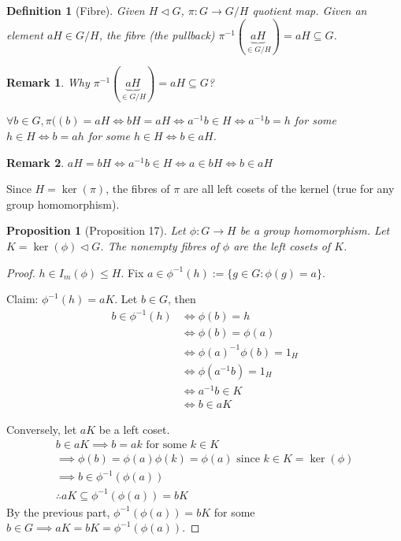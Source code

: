 \documentclass[11pt, oneside]{book}
\theoremstyle{break}
\newtheorem*{proof}{Proof}
\newtheorem{propo}{Proposition}[section]
\newtheorem*{remark}{Remark}
\newtheorem{defn}{Definition}[section]
\begin{document}
\begin{defn}[Fibre]
    Given $H \triangleleft G$, $\pi : G \to G/H$ quotient map. Given an element $aH \in G / H$, the fibre (the pullback) $\pi^{-1} (\underbrace{aH}_{\in G/H}) = aH \subseteq G$.
\end{defn}

\begin{remark}
    Why $\pi^{-1} (\underbrace{aH}_{\in G/H}) = aH \subseteq G$?

    $\forall b \in G, \pi((b) = aH \iff bH = aH \iff a^{-1}b \in H \iff a^{-1}b = h$ for some $h \in H \iff b = ah$ for some $h \in H \iff b \in aH$.
\end{remark}

\begin{remark}
    $aH = bH \iff a^{-1}b \in H \iff a \in bH \iff b \in aH$
\end{remark}

Since $H = \ker(\pi)$, the fibres of $\pi$ are all left cosets of the kernel (true for any group homomorphism).

\begin{propo}[Proposition 17]\label{propo:17}
    Let $\phi : G \to H$ be a group homomorphism. Let $K = \ker(\phi) \triangleleft G$. The nonempty fibres of $\phi$ are the left cosets of $K$.
\end{propo}

\begin{proof}
    $h \in I_m(\phi) \leq H$. Fix $a \in \phi^{-1}(h) := \{g \in G : \phi(g) = a\}$.

    Claim: $\phi^{-1} (h) = aK$. Let $b \in G$, then
    \begin{align*}
        b \in \phi^{-1} (h) &\iff \phi(b) = h \\
                &\iff \phi(b) = \phi(a) \\
                &\iff \phi(a)^{-1} \phi(b) = 1_H \\
                &\iff \phi(a^{-1}b) = 1_H \\
                &\iff a^{-1}b \in K \\
                &\iff b \in aK
    \end{align*}

    Conversely, let $aK$ be a left coset.
    \begin{gather*}
        b \in aK \implies b = ak \text{ for some } k \in K \\
            \implies \phi(b) = \phi(a)\phi(k) = \phi(a) \text{ since } k \in K = \ker(\phi) \\
            \implies b \in \phi^{-1} (\phi(a)) \\
            \therefore aK \subseteq \phi^{-1}(\phi(a)) = bK
    \end{gather*}
    By the previous part, $\phi^{-1}(\phi(a)) = bK$ for some $b \in G \implies aK = bK = \phi^{-1}(\phi(a))$.
\end{proof}
\end{document}
